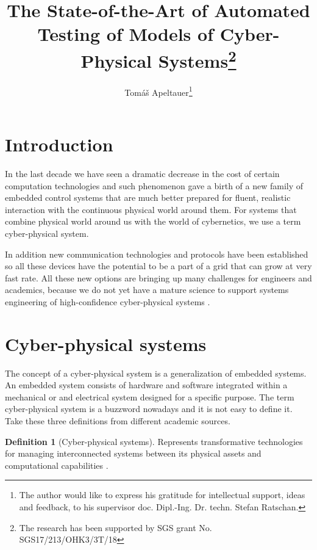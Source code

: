 \documentclass[english,technical,10pt]{FITreport}[2018/01/26]
\title{The State-of-the-Art of Automated Testing of Models of Cyber-Physical Systems\thanks{The research has been supported by SGS grant No. SGS17/213/OHK3/3T/18}}
\author{Tomáš Apeltauer\thanks{The author would like to express his gratitude for intellectual support, ideas and feedback, to his supervisor doc. Dipl.-Ing. Dr. techn. Stefan Ratschan.}\affil{Department of Digital Design\\\theFIT}
	}
\begin{document}
\theoremstyle{definition}
\newtheorem{lemma}{Lemma}
\newtheorem{theorem}[lemma]{Theorem}
\newtheorem{definition}[lemma]{Definition}
\newtheorem{preposition}[lemma]{Preposition}
\newtheorem{example}[lemma]{Example}
\newtheorem{corollary}[lemma]{Corollary}
\newtheorem{proposition}[lemma]{Proposition}
\newtheorem{property}[lemma]{Property}
\newtheorem{observation}[lemma]{Observation}
\theoremstyle{remark}
\newtheorem{notation}[lemma]{Notation}
\newtheorem{note}[lemma]{Note}




\section{Introduction}

In the last decade we have seen a dramatic decrease in the cost of certain computation technologies and such phenomenon gave a birth of a new family of embedded control systems that are much better prepared for fluent, realistic interaction with the continuous physical world around them. For systems that combine physical world around us with the world of cybernetics, we use a term cyber-physical system.

In addition new communication technologies and protocols have been established so all these devices have the potential to be a part of a grid that can grow at very fast rate. All these new options are bringing up many challenges for engineers and academics, because we do not yet have a mature science to support systems engineering of high-confidence cyber-physical systems \cite{NSF:CPS:2017}.

\section{Cyber-physical systems}

The concept of a cyber-physical system is a generalization of embedded systems. An embedded system consists of hardware and software integrated within a mechanical or and electrical system designed for a specific purpose. The term cyber-physical system is a buzzword  nowadays and it is not easy to define it. Take these three definitions from different academic sources.

\begin{definition}[Cyber-physical systems]
    Represents transformative technologies for managing interconnected systems between its physical assets and computational capabilities \cite{LEE201518}.
\end{definition}
\end{document}
